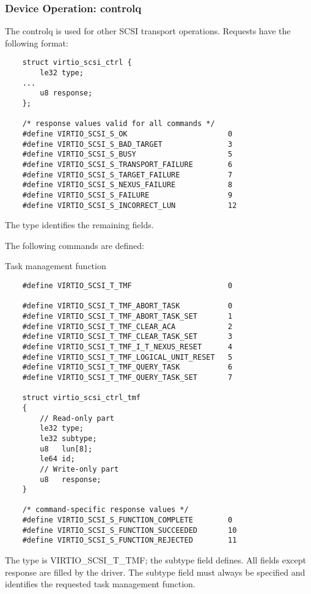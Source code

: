 \subsubsection{Device Operation: controlq}\label{sec:Device Types / SCSI Host Device / Device Operation / Device Operation: controlq}

The controlq is used for other SCSI transport operations.
Requests have the following format:

\begin{lstlisting}
	struct virtio_scsi_ctrl {
		le32 type;
	...
		u8 response;
	};

	/* response values valid for all commands */
	#define VIRTIO_SCSI_S_OK                       0
	#define VIRTIO_SCSI_S_BAD_TARGET               3
	#define VIRTIO_SCSI_S_BUSY                     5
	#define VIRTIO_SCSI_S_TRANSPORT_FAILURE        6
	#define VIRTIO_SCSI_S_TARGET_FAILURE           7
	#define VIRTIO_SCSI_S_NEXUS_FAILURE            8
	#define VIRTIO_SCSI_S_FAILURE                  9
	#define VIRTIO_SCSI_S_INCORRECT_LUN            12
\end{lstlisting}

The type identifies the remaining fields.

The following commands are defined:

  Task management function
\begin{lstlisting}
	#define VIRTIO_SCSI_T_TMF                      0

	#define VIRTIO_SCSI_T_TMF_ABORT_TASK           0
	#define VIRTIO_SCSI_T_TMF_ABORT_TASK_SET       1
	#define VIRTIO_SCSI_T_TMF_CLEAR_ACA            2
	#define VIRTIO_SCSI_T_TMF_CLEAR_TASK_SET       3
	#define VIRTIO_SCSI_T_TMF_I_T_NEXUS_RESET      4
	#define VIRTIO_SCSI_T_TMF_LOGICAL_UNIT_RESET   5
	#define VIRTIO_SCSI_T_TMF_QUERY_TASK           6
	#define VIRTIO_SCSI_T_TMF_QUERY_TASK_SET       7

	struct virtio_scsi_ctrl_tmf
	{
		// Read-only part
		le32 type;
		le32 subtype;
		u8   lun[8];
		le64 id;
		// Write-only part
		u8   response;
	}

	/* command-specific response values */
	#define VIRTIO_SCSI_S_FUNCTION_COMPLETE        0
	#define VIRTIO_SCSI_S_FUNCTION_SUCCEEDED       10
	#define VIRTIO_SCSI_S_FUNCTION_REJECTED        11
\end{lstlisting}

  The type is VIRTIO_SCSI_T_TMF; the subtype field defines. All
  fields except response are filled by the driver. The subtype
  field must always be specified and identifies the requested
  task management function.

